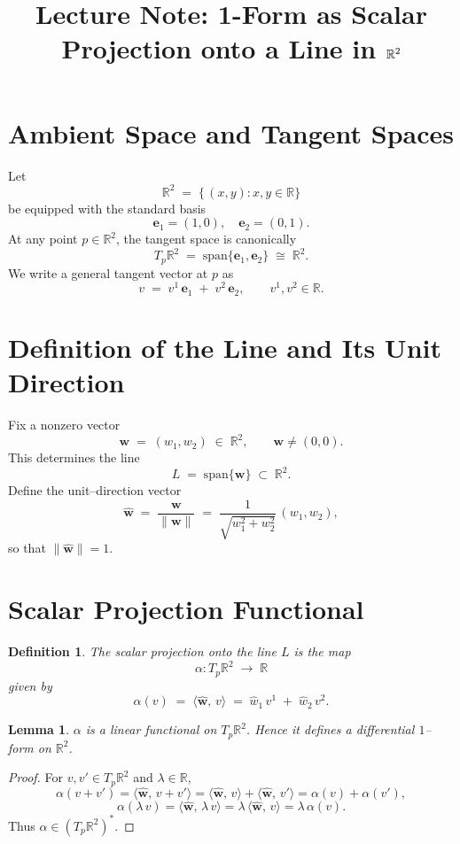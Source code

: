 \documentclass[12pt]{article}
\title{Lecture Note: 1-Form as Scalar Projection onto a Line in \(\R^2\)}
\author{}
\date{}
\numberwithin{equation}{section}
\newtheorem{lemma}[theorem]{Lemma} %
\theoremstyle{definitionstyle}
\newtheorem{definition}{Definition} %
\newcommand{\R}{\mathbb{R}}
\begin{document}
	\maketitle
	
	\section{Ambient Space and Tangent Spaces}
	Let
	\[
	\R^2 \;=\;\{\, (x,y) : x,y\in\R\}
	\]
	be equipped with the standard basis
	\[
	\mathbf{e}_1=(1,0),
	\quad
	\mathbf{e}_2=(0,1).
	\]
	At any point \(p\in\R^2\), the tangent space is canonically
	\[
	T_p\R^2 \;=\;\mathrm{span}\{\mathbf{e}_1,\mathbf{e}_2\}\;\cong\;\R^2.
	\]
	We write a general tangent vector at \(p\) as
	\[
	v \;=\; v^1\,\mathbf{e}_1 \;+\; v^2\,\mathbf{e}_2,
	\qquad
	v^1,v^2\in\R.
	\]
	
	\section{Definition of the Line and Its Unit Direction}
	Fix a nonzero vector
	\[
	\mathbf{w} \;=\;(w_1,w_2)\;\in\;\R^2,
	\qquad
	\mathbf{w}\neq(0,0).
	\]
	This determines the line
	\[
	L \;=\;\mathrm{span}\{\mathbf{w}\}
	\;\subset\;\R^2.
	\]
	Define the unit–direction vector
	\[
	\hat{\mathbf{w}}
	\;=\;
	\frac{\mathbf{w}}{\|\mathbf{w}\|}
	\;=\;
	\frac{1}{\sqrt{w_1^2+w_2^2}}\,(w_1,w_2),
	\]
	so that \(\|\hat{\mathbf{w}}\|=1\).
	
	\section{Scalar Projection Functional}
	\begin{definition}
		The \emph{scalar projection onto the line \(L\)} is the map
		\[
		\alpha\colon T_p\R^2\;\longrightarrow\;\R
		\]
		given by
		\[
		\alpha(v)
		\;=\;
		\bigl\langle \hat{\mathbf{w}},\,v\bigr\rangle
		\;=\;
		\hat w_1\,v^1 \;+\;\hat w_2\,v^2.
		\]
	\end{definition}
	
	\begin{lemma}
		\(\alpha\) is a linear functional on \(T_p\R^2\).  Hence it defines a differential
		\(1\)--form on \(\R^2\).
	\end{lemma}
	
	\begin{proof}
		For \(v,v'\in T_p\R^2\) and \(\lambda\in\R\),
		\[
		\alpha(v+v')
		=\bigl\langle\hat{\mathbf{w}},\,v+v'\bigr\rangle
		=\bigl\langle\hat{\mathbf{w}},\,v\bigr\rangle
		+\bigl\langle\hat{\mathbf{w}},\,v'\bigr\rangle
		=\alpha(v)+\alpha(v'),
		\]
		\[
		\alpha(\lambda\,v)
		=\bigl\langle\hat{\mathbf{w}},\,\lambda\,v\bigr\rangle
		=\lambda\,\bigl\langle\hat{\mathbf{w}},\,v\bigr\rangle
		=\lambda\,\alpha(v).
		\]
		Thus \(\alpha\in (T_p\R^2)^\ast\).
	\end{proof}
	
\end{document}
